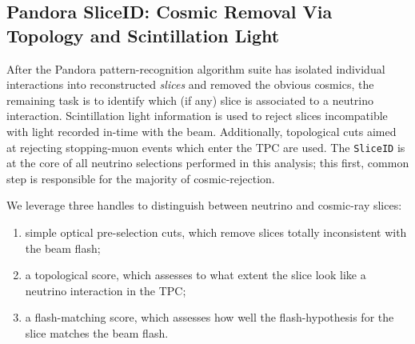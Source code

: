 \subsection{Pandora SliceID: Cosmic Removal Via Topology and Scintillation Light}
\label{sec:sliceID:SliceID}
\par After the Pandora pattern-recognition algorithm suite has isolated individual interactions into reconstructed \emph{slices} and removed the obvious cosmics, the remaining task is to identify which (if any) slice is associated to a neutrino interaction. Scintillation light information is used to reject slices incompatible with light recorded in-time with the beam. Additionally, topological cuts aimed at rejecting stopping-muon events which enter the TPC are used. The \texttt{SliceID} is at the core of all neutrino selections performed in this analysis; this first, common step is responsible for the majority of cosmic-rejection.
\\
\par We leverage three handles to distinguish between neutrino and cosmic-ray slices:
\begin{enumerate}
    \item simple optical pre-selection cuts, which remove slices totally inconsistent with the beam flash;
    \item a topological score, which assesses to what extent the slice look like a neutrino interaction in the TPC;
    \item a flash-matching score, which assesses how well the flash-hypothesis for the slice matches the beam flash.
\end{enumerate}

